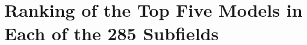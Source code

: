 \clearpage
\hypertarget{top5}{}
\section{Ranking of the Top Five Models in Each of the 285 Subfields}

